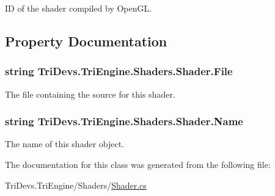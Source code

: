 I\-D of the shader compiled by Open\-G\-L. 



\subsection{Property Documentation}
\hypertarget{class_tri_devs_1_1_tri_engine_1_1_shaders_1_1_shader_a0421c4a9222ee6d170eb083bc997766e}{
\subsubsection[{File}]{\setlength{\rightskip}{0pt plus 5cm}string Tri\-Devs.\-Tri\-Engine.\-Shaders.\-Shader.\-File\hspace{0.3cm}{\ttfamily [get]}}}\label{class_tri_devs_1_1_tri_engine_1_1_shaders_1_1_shader_a0421c4a9222ee6d170eb083bc997766e}


The file containing the source for this shader. 

\hypertarget{class_tri_devs_1_1_tri_engine_1_1_shaders_1_1_shader_a23972333c28fdd8005cc9b747497f0ab}{
\subsubsection[{Name}]{\setlength{\rightskip}{0pt plus 5cm}string Tri\-Devs.\-Tri\-Engine.\-Shaders.\-Shader.\-Name\hspace{0.3cm}{\ttfamily [get]}}}\label{class_tri_devs_1_1_tri_engine_1_1_shaders_1_1_shader_a23972333c28fdd8005cc9b747497f0ab}


The name of this shader object. 



The documentation for this class was generated from the following file\-:\begin{DoxyCompactItemize}
\item 
Tri\-Devs.\-Tri\-Engine/\-Shaders/\hyperlink{_shader_8cs}{Shader.\-cs}\end{DoxyCompactItemize}
